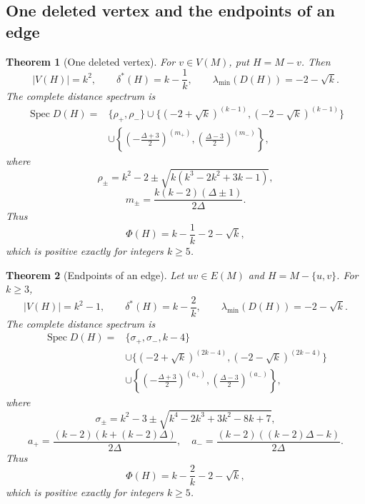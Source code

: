 \documentclass[a4paper,10pt,reqno]{amsart}
\theoremstyle{plain}
\newtheorem{theorem}{Theorem}[section]
\theoremstyle{definition}
\theoremstyle{remark}
\newcommand{\Spec}{\operatorname{Spec}}
\begin{document}
\subsection{One deleted vertex and the endpoints of an edge}

\begin{theorem}[One deleted vertex]\label{thm:one-puncture}
For \(v\in V(M)\), put \(H=M-v\).  Then
\[
 |V(H)|=k^2,
 \qquad \delta^*(H)=k-\frac1k,
 \qquad \lambda_{\min}(D(H))=-2-\sqrt{k}.
\]
The complete distance spectrum is
\begin{align*}
\Spec D(H)={}&\{\rho_+,\rho_-\}
 \cup\{(-2+\sqrt{k})^{(k-1)},(-2-\sqrt{k})^{(k-1)}\}\\
&\cup\left\{\left(-\frac{\Delta+3}{2}\right)^{(m_+)},
\left(\frac{\Delta-3}{2}\right)^{(m_-)}\right\},
\end{align*}
where
\[
 \rho_\pm=k^2-2\pm\sqrt{k(k^3-2k^2+3k-1)},
\]
\[
 m_\pm=\frac{k(k-2)(\Delta\pm1)}{2\Delta}.
\]
Thus
\[
 \Phi(H)=k-\frac1k-2-\sqrt{k},
\]
which is positive exactly for integers \(k\ge5\).
\end{theorem}

\begin{theorem}[Endpoints of an edge]\label{thm:edge-puncture}
Let \(uv\in E(M)\) and \(H=M-\{u,v\}\).  For \(k\ge3\),
\[
 |V(H)|=k^2-1,
 \qquad \delta^*(H)=k-\frac2k,
 \qquad \lambda_{\min}(D(H))=-2-\sqrt{k}.
\]
The complete distance spectrum is
\begin{align*}
\Spec D(H)={}&\{\sigma_+,\sigma_-,k-4\}\\
&\cup\{(-2+\sqrt{k})^{(2k-4)},(-2-\sqrt{k})^{(2k-4)}\}\\
&\cup\left\{\left(-\frac{\Delta+3}{2}\right)^{(a_+)},
\left(\frac{\Delta-3}{2}\right)^{(a_-)}\right\},
\end{align*}
where
\[
 \sigma_\pm=k^2-3\pm\sqrt{k^4-2k^3+3k^2-8k+7},
\]
\[
 a_+=\frac{(k-2)(k+(k-2)\Delta)}{2\Delta},
 \quad
 a_-=\frac{(k-2)((k-2)\Delta-k)}{2\Delta}.
\]
Thus
\[
 \Phi(H)=k-\frac2k-2-\sqrt{k},
\]
which is positive exactly for integers \(k\ge5\).
\end{theorem}
\end{document}

